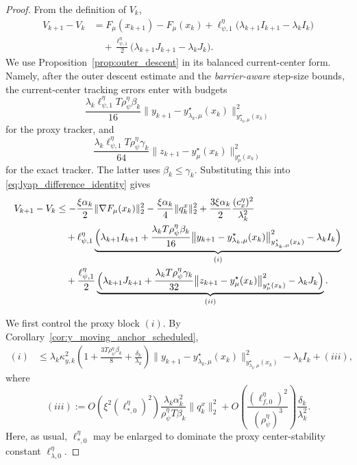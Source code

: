 \documentclass{article}
\begin{document}
\begin{proof}
From the definition of \(V_k\),
\begin{align}
V_{k+1}-V_k
&=
F_\mu(x_{k+1})-F_\mu(x_k)
+
\ell_{\psi,1}^\eta
\bigl(\lambda_{k+1}I_{k+1}-\lambda_k I_k\bigr)
\nonumber\\
&\quad
+
\frac{\ell_{\psi,1}^\eta}{2}
\bigl(\lambda_{k+1}J_{k+1}-\lambda_k J_k\bigr).
\label{eq:lyap_difference_identity}
\end{align}
We use Proposition~\ref{prop:outer_descent} in its balanced current-center form. Namely, after the
outer descent estimate and the \textit{barrier-aware} step-size bounds, the current-center tracking errors enter
with budgets
\[
\frac{\lambda_k\ell_{\psi,1}^\eta T\rho_\psi^\eta\beta_k}{16}
\big\|y_{k+1}-y_{\lambda_k,\mu}^\star(x_k)\big\|_{y_{\lambda_k,\mu}^\star(x_k)}^2
\]
for the proxy tracker, and
\[
\frac{\lambda_k\ell_{\psi,1}^\eta T\rho_\psi^\eta\gamma_k}{64}
\big\|z_{k+1}-y_\mu^\star(x_k)\big\|_{y_\mu^\star(x_k)}^2
\]
for the exact tracker. The latter uses \(\beta_k\le\gamma_k\). Substituting this into
\eqref{eq:lyap_difference_identity} gives
\begin{align}
V_{k+1}-V_k
&\le
-\frac{\xi\alpha_k}{2}\|\nabla F_\mu(x_k)\|_2^2
-\frac{\xi\alpha_k}{4}\|q_k^x\|_2^2
+
\frac{3\xi\alpha_k}{2}\frac{(c_x^\eta)^2}{\lambda_k^2}
\nonumber\\
&\quad
+\ell_{\psi,1}^\eta
\underbrace{
\Bigl(
\lambda_{k+1}I_{k+1}
+
\frac{\lambda_kT\rho_\psi^\eta\beta_k}{16}
\big\|y_{k+1}-y_{\lambda_k,\mu}^\star(x_k)\big\|_{y_{\lambda_k,\mu}^\star(x_k)}^2
-\lambda_k I_k
\Bigr)
}_{(i)}
\nonumber\\
&\quad
+\frac{\ell_{\psi,1}^\eta}{2}
\underbrace{
\Bigl(
\lambda_{k+1}J_{k+1}
+
\frac{\lambda_kT\rho_\psi^\eta\gamma_k}{32}
\big\|z_{k+1}-y_\mu^\star(x_k)\big\|_{y_\mu^\star(x_k)}^2
-\lambda_k J_k
\Bigr)
}_{(ii)} .
\label{eq:lyap_decomposition}
\end{align}

We first control the proxy block \((i)\). By
Corollary~\ref{cor:y_moving_anchor_scheduled},
\begin{align}
(i)
&\le
\lambda_k\kappa_{y,k}^2
\left(
1+\frac{3T\rho_\psi^\eta\beta_k}{8}
+\frac{\delta_k}{\lambda_k}
\right)
\big\|y_{k+1}-y_{\lambda_k,\mu}^\star(x_k)\big\|_{y_{\lambda_k,\mu}^\star(x_k)}^2
-\lambda_k I_k
+
(iii),
\label{eq:lyap_proxy_block_raw}
\end{align}
where
\begin{equation}
\label{eq:lyap_proxy_remainder}
(iii)
:=
O\!\left(\xi^2(\ell_{*,0}^\eta)^2\right)
\frac{\lambda_k\alpha_k^2}{\rho_\psi^\eta T\beta_k}\|q_k^x\|_2^2
+
O\!\left(\frac{(\ell_{f,0}^\eta)^2}{(\rho_\psi^\eta)^3}\right)
\frac{\delta_k}{\lambda_k^2}.
\end{equation}
Here, as usual, \(\ell_{*,0}^\eta\) may be enlarged to dominate the proxy center-stability constant
\(\ell_{\lambda,0}^\eta\).


\end{proof}
\end{document}
